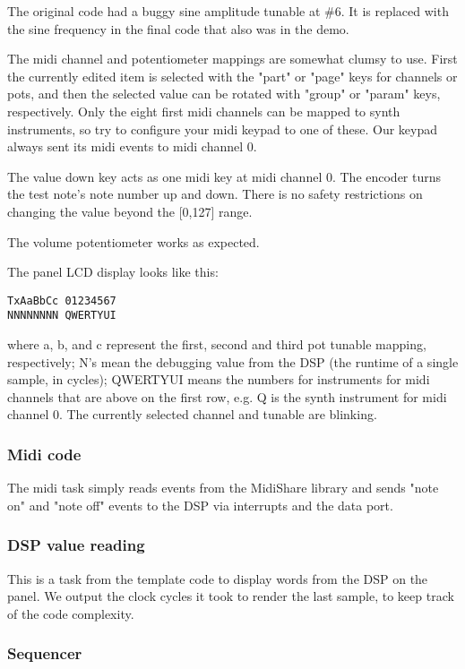 \documentclass[10pt,a4paper,oneside]{article}
\begin{document}
The original code had a buggy sine amplitude tunable at \#6. It is replaced with the sine frequency in the final code that also was in the demo.

The midi channel and potentiometer mappings are somewhat clumsy to use. First the currently edited item is selected with the "part" or "page" keys for channels or pots, and then the selected value can be rotated with "group" or "param" keys, respectively. Only the eight first midi channels can be mapped to synth instruments, so try to configure your midi keypad to one of these. Our keypad always sent its midi events to midi channel 0.

The value down key acts as one midi key at midi channel 0. The encoder turns the test note's note number up and down. There is no safety restrictions on changing the value beyond the [0,127] range.

The volume potentiometer works as expected.

The panel LCD display looks like this:

\begin{verbatim}
TxAaBbCc 01234567
NNNNNNNN QWERTYUI
\end{verbatim}

where a, b, and c represent the first, second and third pot tunable mapping, respectively; N's mean the debugging value from the DSP (the runtime of a single sample, in cycles); QWERTYUI means the numbers for instruments for midi channels that are above on the first row, e.g. Q is the synth instrument for midi channel 0. The currently selected channel and tunable are blinking.


\subsubsection{Midi code}

The midi task simply reads events from the MidiShare library and sends "note on" and "note off" events to the DSP via interrupts and the data port.

\subsubsection{DSP value reading}

This is a task from the template code to display words from the DSP on the panel. We output the clock cycles it took to render the last sample, to keep track of the code complexity.

\subsubsection{Sequencer}
\end{document}
